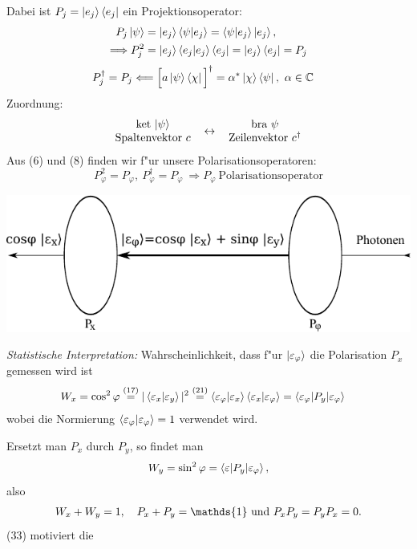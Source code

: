\documentclass[a4paper]{scrartcl}
\newcommand{\CC}{\ensuremath \mathbb{C}}
\newcommand{\dOne}{\ensuremath \mathds{1}}
\begin{document}
{Dabei ist $P_j = \ket{e_j} \bra{e_j}$ ein Projektionsoperator:
\begin{align}
P_j \ket{\psi} & = \ket {e_j} \braket{ \psi| e_j}  = \braket{ \psi | e_j} \ket{e_j}, \\
\Longrightarrow P_j^2 & = \ket{e_j} \braket{e_j | e_j } \bra{e_j} = \ket{e_j} \bra{e_j} = P_j \notag
\end{align}
\begin{align}
P_j^\dagger & = P_j \Longleftarrow \Big[ a \ket{\psi}\bra{\chi} \Big]^\dagger = \alpha^* \ket{\chi} \bra{\psi}, \ \alpha \in \CC
\end{align}
Zuordnung:
\begin{align}
\mathrm{
\begin{tabular}{c c c}
ket $\ket{\psi}$ & \multirow{2}{*}{$\leftrightarrow$} & bra $\psi$ \\
Spaltenvektor $c$ & & Zeilenvektor $c^\dagger$
\end{tabular}
}
\end{align}
Aus (6) und (8) finden wir f"ur unsere Polarisationsoperatoren:
$$P_\varphi^2 = P_\varphi, \ P_\varphi^\dagger = P_\varphi \ \Longrightarrow P_\varphi \mathrm{ \ Polarisationsoperator}$$
\begin{center}
\includegraphics{030Polarisationsfilter}
\end{center}
\emph{Statistische Interpretation:} Wahrscheinlichkeit, dass f"ur $\ket{ \varepsilon_\varphi}$ die Polarisation $P_x$ gemessen wird ist 
\begin{align}
W_x & = \cos^2 \varphi 
 \stackrel{(17)}= | \braket {\varepsilon_x | \varepsilon_y } |^2 
 \stackrel{(21)}= \braket{ \varepsilon_\varphi | \varepsilon_x} \braket{ \varepsilon_x | \varepsilon_\varphi} 
 = \braket{ \varepsilon_\varphi | P_y | \varepsilon_\varphi}
\end{align}
wobei die Normierung $\braket{ \varepsilon_\varphi | \varepsilon_\varphi } = 1$ verwendet wird.

Ersetzt man $P_x$ durch $P_y$, so findet man 
\begin{align}
W_y = \sin^2 \varphi = \braket{ \varepsilon | P_y | \varepsilon_\varphi},
\end{align}
also
\begin{align}
W_x + W_y = 1, \quad P_x + P_y = \dOne \ \mathrm{und} \ P_xP_y = P_yP_x = 0.
\end{align}
(33) motiviert die 

}
\end{document}
